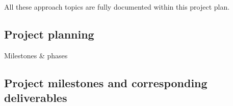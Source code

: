 All these approach topics are fully documented within this project plan.


\subsection{Project planning}
Milestones \& phases

\subsection{Project milestones and corresponding deliverables }
\lipsum[1]
